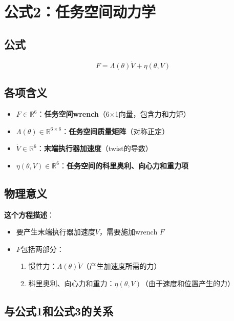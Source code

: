 \documentclass[12pt,a4paper]{article}
\begin{document}
\section{公式2：任务空间动力学}

\subsection{公式}

\begin{equation}
F = \Lambda(\theta)\dot{V} + \eta(\theta, V) \tag{8.89}
\end{equation}

\subsection{各项含义}

\begin{itemize}
\item $F \in \mathbb{R}^6$：\textbf{任务空间wrench}（6×1向量，包含力和力矩）
\item $\Lambda(\theta) \in \mathbb{R}^{6 \times 6}$：\textbf{任务空间质量矩阵}（对称正定）
\item $\dot{V} \in \mathbb{R}^6$：\textbf{末端执行器加速度}（twist的导数）
\item $\eta(\theta, V) \in \mathbb{R}^6$：\textbf{任务空间的科里奥利、向心力和重力项}
\end{itemize}

\subsection{物理意义}

\textbf{这个方程描述}：
\begin{itemize}
\item 要产生末端执行器加速度$\dot{V}$，需要施加wrench $F$
\item $F$包括两部分：
\begin{enumerate}
\item 惯性力：$\Lambda(\theta)\dot{V}$（产生加速度所需的力）
\item 科里奥利、向心力和重力：$\eta(\theta, V)$（由于速度和位置产生的力）
\end{enumerate}
\end{itemize}

\subsection{与公式1和公式3的关系}
\end{document}
